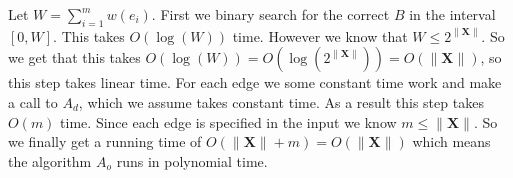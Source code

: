 Let $W=\sum_{i=1}^m w(e_i)$. First we binary search for the correct $B$ in the interval $[0,W]$. This takes $O(\log(W))$ time. However we know that $W \leq 2^{\|\mathbf{X}\|}$. So we get that this takes $O(\log(W)) = O(\log(2^{\| \mathbf{X}\|})) = O(\|\textbf{X}\|)$, so this step takes linear time. 
For each edge we some constant time work and make a call to $A_d$, which we assume takes constant time. As a result this step takes $O(m)$ time. Since each edge is specified in the input we know $m \leq \|\textbf{X}\|$. So we finally get a running time of $O(\|\textbf{X}\| + m) = O(\|\textbf{X}\|)$ which means the algorithm $A_o$ runs in polynomial time.
